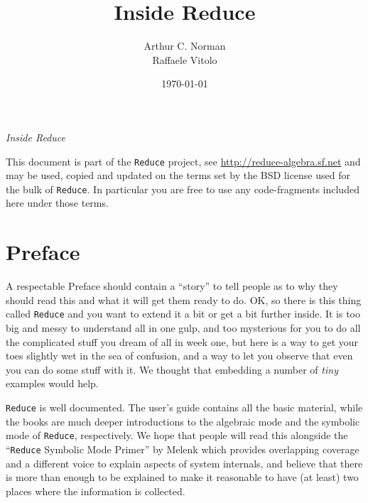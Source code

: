 \documentclass[12pt,twoside,openright]{memoir}
\author{Arthur C. Norman
\\
Raffaele Vitolo}
\title{Inside Reduce}
\date{\today}
\makeatletter
\newcommand{\reduce}{\texttt{Reduce}\xspace}
\def\maketitle{%
  \null
  \thispagestyle{empty}%
  \vfill
  \begin{center}\leavevmode
    \normalfont
    {\LARGE\raggedleft \@author\par}%
    \hrulefill\par
    {\huge\raggedright \@title\par}%
    \vskip 1cm
  \end{center}%
  \vfill
  \null
  \cleardoublepage
  }
\makeatother
\begin{document}
\let\cleardoublepage\clearpage


\maketitle






\frontmatter

\null\vfill

\begin{flushleft}
\textit{Inside Reduce}




\bigskip





This document is part of the \reduce project, see
\url{http://reduce-algebra.sf.net} and may be used, copied and updated
on the terms set by the BSD license used for the bulk of \reduce. In
particular you are free to use any code-fragments included here under
those terms.




\end{flushleft}
\let\cleardoublepage\clearpage

\cleardoublepage

\chapter{Preface}
A respectable Preface should contain a ``story'' to tell people as to why they
should read this and what it will get them ready to do. OK, so there is this
thing called \reduce and you want to extend it a bit or get a bit further
inside. It is too big and messy to understand all in one gulp, and too
mysterious for you to do all the complicated stuff you dream of all in week
one, but here is a way to get your toes slightly wet in the sea of confusion,
and a way to let you observe that even you can do some stuff with it.
We thought that embedding a number of \emph{tiny} examples would
help.

\reduce is well documented. The user's guide \cite{r38} contains all the basic
material, while the books \cite{mcw,bc} are much deeper introductions to the
algebraic mode and the symbolic mode of \reduce, respectively. We hope that
people will read this alongside the ``\reduce Symbolic Mode Primer'' by
Melenk \cite{melenk} which provides overlapping coverage and a different voice
to explain aspects of system internals, and believe that there is more than
enough to be explained to make it reasonable to have (at least) two places
where the information is collected.
\end{document}
